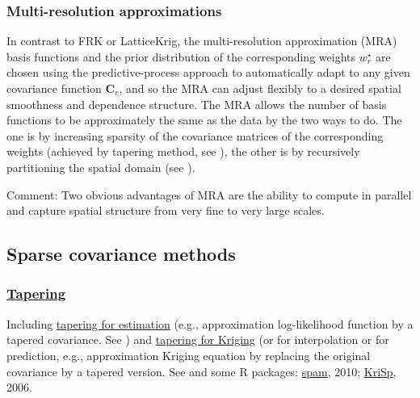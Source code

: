 \documentclass[
12pt, %
a4paper, %
oneside, %
headinclude,footinclude, %
BCOR5mm, %
]{scrartcl}
\begin{document}
\subsubsection{Multi-resolution approximations}
In contrast to FRK or LatticeKrig, the multi-resolution approximation (MRA) basis functions and the prior distribution of the corresponding weights $w_r^{\star}$ are chosen using the predictive-process approach to automatically adapt to any given covariance function $\boldsymbol{C}_r$, and so the MRA can adjust flexibly to a desired spatial smoothness and dependence structure. The MRA allows the number of basis functions to be approximately the same as the data by the two ways to do. The one is by increasing sparsity of the covariance matrices of the corresponding weights (achieved by tapering method, see  \href{https://chenyw68.github.io/Literature/[2017-formal]Parallel inference for massive distributed spatial data using low-rank models.pdf
}{\citep{katzfuss2017parallel}}), the other is by recursively partitioning the spatial domain (see \href{https://chenyw68.github.io/Literature/[2017]A Multi-Resolution Approximation for Massive Spatial Datasets.pdf}{\citep{katzfuss2017multi}}).

\textcolor[rgb]{1.00,0.00,1.00}{Comment:} Two obvious advantages of MRA are the ability to compute in parallel and capture spatial structure from very fine to very large scales.


\subsection{Sparse covariance methods}
\subsubsection{\href{https://user.math.uzh.ch/furrer/software/KriSp/}{Tapering}}
Including \href{https://chenyw68.github.io/Literature/[2008]Covariance Tapering for Likelihood Based Estimation in Large Spatial Data Sets.pdf}{tapering for estimation} (e.g.,  approximation log-likelihood function by a tapered covariance. See \href{https://chenyw68.github.io/Literature/[2008]Covariance Tapering for Likelihood Based Estimation in Large Spatial Data Sets.pdf}{\cite{kaufman2008covariance}}) and \href{https://chenyw68.github.io/Literature/[2006]Covariance tapering for interpolation of large spatial datasets.pdf}{tapering for Kriging} (or for interpolation or for prediction, e.g.,  approximation Kriging equation by replacing the original covariance by a tapered version. See \href{https://chenyw68.github.io/Literature/[2006]Covariance tapering for interpolation of large spatial datasets.pdf}{\cite{furrer2006covariance}} and some R packages: \href{https://chenyw68.github.io/Literature/[2010]spam-A Sparse Matrix R Package with Emphasis on MCMC Methods for Gaussian Markov Random Fields.pdf}{spam}, 2010; \href{https://chenyw68.github.io/Literature/[2006]KriSp.pdff}{KriSp}, 2006.
\end{document}

